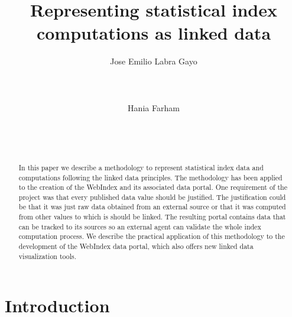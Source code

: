 \documentclass{acm_proc_article-sp}
\begin{document}
\title{Representing statistical index computations as linked data}

\author{
\alignauthor
Jose Emilio Labra Gayo\\
       \\
       \\
       \\
\alignauthor
Hania Farham\\
       \\
       \\
       \\
}

\maketitle
\begin{abstract}

In this paper we describe a methodology to represent statistical index data and computations 
following the linked data principles. 
The methodology has been applied to the creation of the
 WebIndex and its associated data portal.
One requirement of the project was that every published data value should be justified. 
The justification could be that it was just raw data obtained from an external source or that it was computed from other values to which is should be linked. 
The resulting portal contains data that can be tracked to its sources so an external agent
can validate the whole index computation process.
We describe the practical application of this methodology to the development of the WebIndex data portal, 
which also offers new linked data visualization tools.

\end{abstract}




\section{Introduction}
\end{document}
